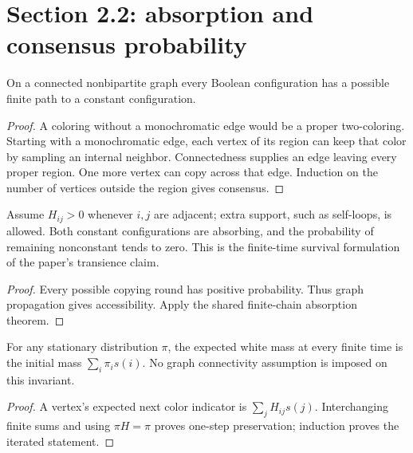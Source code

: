 \section{Section 2.2: absorption and consensus probability}
\begin{lemma}\label{lem:propagation}
\leanok{}
On a connected nonbipartite graph every Boolean configuration has a possible
finite path to a constant configuration.
\end{lemma}
\begin{proof}\leanok
A coloring without a monochromatic edge would be a proper two-coloring.
Starting with a monochromatic edge, each vertex of its region can keep that
color by sampling an internal neighbor. Connectedness supplies an edge leaving
every proper region. One more vertex can copy across that edge. Induction on
the number of vertices outside the region gives consensus.
\end{proof}
\begin{lemma}\label{lem:21}
\leanok{}
Assume $H_{ij}>0$ whenever $i,j$ are adjacent; extra support, such as
self-loops, is allowed. Both constant configurations
are absorbing, and the probability of remaining nonconstant tends to zero.
This is the finite-time survival formulation of the paper's transience claim.
\end{lemma}
\begin{proof}\leanok
Every possible copying round has positive probability. Thus graph propagation
gives accessibility. Apply the shared finite-chain absorption theorem.
\end{proof}
\begin{lemma}\label{lem:23}
\leanok{}
For any stationary distribution $\pi$, the expected white mass at every finite
time is the initial mass $\sum_i\pi_i s(i)$. No graph connectivity assumption
is imposed on this invariant.
\end{lemma}
\begin{proof}\leanok
A vertex's expected next color indicator is $\sum_jH_{ij}s(j)$.
Interchanging finite sums and using $\pi H=\pi$ proves one-step preservation;
induction proves the iterated statement.
\end{proof}
